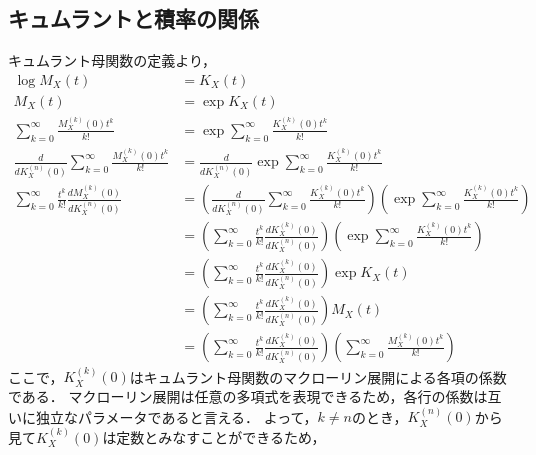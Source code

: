 \documentclass[dvipdfmx]{jsarticle}
\begin{document}
 \subsection{キュムラントと積率の関係}
キュムラント母関数の定義より，
 \begin{align}
  \log M_X\left(t\right)&=K_X\left(t\right)\nonumber\\
  M_X\left(t\right)&=\exp K_X\left(t\right)\nonumber\\
  \sum_{k=0}^\infty \frac{M_X^{\left(k\right)}\left(0\right)t^k}{k!}&=\exp\sum_{k=0}^\infty \frac{K_X^{\left(k\right)}\left(0\right)t^k}{k!}\nonumber\\
  \frac{d}{dK_X^{\left(n\right)}\left(0\right)}\sum_{k=0}^\infty \frac{M_X^{\left(k\right)}\left(0\right)t^k}{k!}&=\frac{d}{dK_X^{\left(n\right)}\left(0\right)}\exp\sum_{k=0}^\infty \frac{K_X^{\left(k\right)}\left(0\right)t^k}{k!}\nonumber\\
  \sum_{k=0}^\infty \frac{t^k}{k!}\frac{dM_X^{\left(k\right)}\left(0\right)}{dK_X^{\left(n\right)}\left(0\right)}&=\left(\frac{d}{dK_X^{\left(n\right)}\left(0\right)}\sum_{k=0}^\infty\frac{K_X^{\left(k\right)}\left(0\right)t^k}{k!}\right)\left(\exp\sum_{k=0}^\infty\frac{K_X^{\left(k\right)}\left(0\right)t^k}{k!}\right)\nonumber\\
  &=\left(\sum_{k=0}^\infty\frac{t^k}{k!}\frac{dK_X^{\left(k\right)}\left(0\right)}{dK_X^{\left(n\right)}\left(0\right)}\right)\left(\exp\sum_{k=0}^\infty\frac{K_X^{\left(k\right)}\left(0\right)t^k}{k!}\right)\nonumber\\
  &=\left(\sum_{k=0}^\infty\frac{t^k}{k!}\frac{dK_X^{\left(k\right)}\left(0\right)}{dK_X^{\left(n\right)}\left(0\right)}\right)\exp K_X\left(t\right)\nonumber\\
  &=\left(\sum_{k=0}^\infty\frac{t^k}{k!}\frac{dK_X^{\left(k\right)}\left(0\right)}{dK_X^{\left(n\right)}\left(0\right)}\right)M_X\left(t\right)\nonumber\\
  &=\left(\sum_{k=0}^\infty\frac{t^k}{k!}\frac{dK_X^{\left(k\right)}\left(0\right)}{dK_X^{\left(n\right)}\left(0\right)}\right)\left(\sum_{k=0}^\infty\frac{M_X^{\left(k\right)}\left(0\right)t^k}{k!}\right)\nonumber
 \end{align}
ここで，$K_X^{\left(k\right)}\left(0\right)$はキュムラント母関数のマクローリン展開による各項の係数である．
マクローリン展開は任意の多項式を表現できるため，各行の係数は互いに独立なパラメータであると言える．
よって，$k \ne n$のとき，$K_X^{\left(n\right)}\left(0\right)$から見て$K_X^{\left(k\right)}\left(0\right)$は定数とみなすことができるため，
\end{document}
